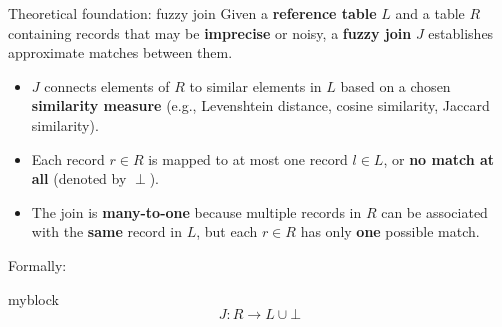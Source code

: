 \documentclass[8pt]{beamer} %
\begin{document}
%	
%	
%	



\begin{frame}{Theoretical foundation: fuzzy join}
	Given a \textbf{reference table} $L$ and a table $R$ containing records that may be \textbf{imprecise} or noisy, a \textbf{fuzzy join} $J$ establishes approximate matches between them.
	
	\begin{itemize}
	\item $J$ connects elements of $R$ to similar elements in $L$ based on a chosen \textbf{similarity measure} (e.g., Levenshtein distance, cosine similarity, Jaccard similarity).
	\item Each record $r \in R$ is mapped to at most one record $l \in L$, or \textbf{no match at all} (denoted by $\perp$).
	\item The join is \textbf{many-to-one} because multiple records in $R$ can be associated with the \textbf{same} record in $L$, but each $r \in R$ has only \textbf{one} possible match.
	\end{itemize}
	
	Formally:
	
	\begin{beamercolorbox}[rounded=true, shadow=true, leftskip=1em, rightskip=1em]{myblock}
		$$
		J: R \rightarrow L \cup \bot
		$$
	\end{beamercolorbox}
	
\end{frame}
\end{document}
